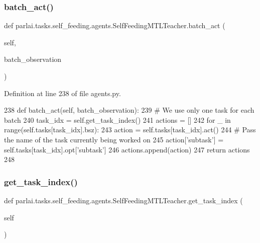 \subsubsection{\texorpdfstring{batch\+\_\+act()}{batch\_act()}}
{\footnotesize\ttfamily def parlai.\+tasks.\+self\+\_\+feeding.\+agents.\+Self\+Feeding\+M\+T\+L\+Teacher.\+batch\+\_\+act (\begin{DoxyParamCaption}\item[{}]{self,  }\item[{}]{batch\+\_\+observation }\end{DoxyParamCaption})}



Definition at line 238 of file agents.\+py.


\begin{DoxyCode}
238     \textcolor{keyword}{def }batch\_act(self, batch\_observation):
239         \textcolor{comment}{# We use only one task for each batch}
240         task\_idx = self.get\_task\_index()
241         actions = []
242         \textcolor{keywordflow}{for} \_ \textcolor{keywordflow}{in} range(self.tasks[task\_idx].bsz):
243             action = self.tasks[task\_idx].act()
244             \textcolor{comment}{# Pass the name of the task currently being worked on}
245             action[\textcolor{stringliteral}{'subtask'}] = self.tasks[task\_idx].opt[\textcolor{stringliteral}{'subtask'}]
246             actions.append(action)
247         \textcolor{keywordflow}{return} actions
248 
\end{DoxyCode}
\mbox{\label{classparlai_1_1tasks_1_1self__feeding_1_1agents_1_1SelfFeedingMTLTeacher_a19777439481c688e85f355802ff4a791}} 
\subsubsection{\texorpdfstring{get\+\_\+task\+\_\+index()}{get\_task\_index()}}
{\footnotesize\ttfamily def parlai.\+tasks.\+self\+\_\+feeding.\+agents.\+Self\+Feeding\+M\+T\+L\+Teacher.\+get\+\_\+task\+\_\+index (\begin{DoxyParamCaption}\item[{}]{self }\end{DoxyParamCaption})}



